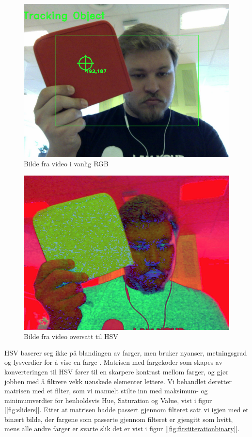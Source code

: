 \begin{figure}[h!]
	\centering
	\includegraphics[scale=0.47]{img/first-rgb.jpg}
	\caption[Første iterasjon RGB bilde]{Bilde fra video i vanlig RGB}
	\label{fig:firstiterationrgb}
\end{figure}

\begin{figure}[h!]
	\centering
	\includegraphics[scale=0.47]{img/first-hsv.jpg}
	\caption[Første iterasjon HSV bilde]{Bilde fra video oversatt til HSV}
	\label{fig:firstiterationhsv}
\end{figure}

HSV baserer seg ikke på blandingen av farger, men bruker nyanser, metningsgrad og lysverdier for å vise en farge . Matrisen med fargekoder som skapes av konverteringen til HSV fører til en skarpere kontrast mellom farger, og gjør jobben med å filtrere vekk uønskede elementer lettere. Vi behandlet deretter matrisen med et filter, som vi manuelt stilte inn med maksimum- og minimumverdier for henholdsvis Hue, Saturation og Value, vist i figur [\ref{fig:sliders}]. Etter at matrisen hadde passert gjennom filteret satt vi igjen med et binært bilde, der fargene som passerte gjennom filteret er gjengitt som hvitt, mens alle andre farger er svarte slik det er vist i figur [\ref{fig:firstiterationbinary}].

